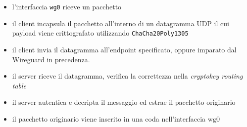 \begin{itemize}
\tightlist
\item
  l'interfaccia \passthrough{\lstinline!wg0!} riceve un pacchetto
\item
  il client incapsula il pacchetto all'interno di un datagramma UDP il
  cui payload viene crittografato utilizzando
  \passthrough{\lstinline!ChaCha20Poly1305!}
\item
  il client invia il datagramma all'endpoint specificato, oppure
  imparato dal Wireguard in precedenza.
\item
  il server riceve il datagramma, verifica la correttezza nella
  \emph{cryptokey routing table}
\item
  il server autentica e decripta il messaggio ed estrae il pacchetto
  originario
\item
  il pacchetto originario viene inserito in una coda nell'interfaccia
  \(\text{wg}0\)
\end{itemize}
